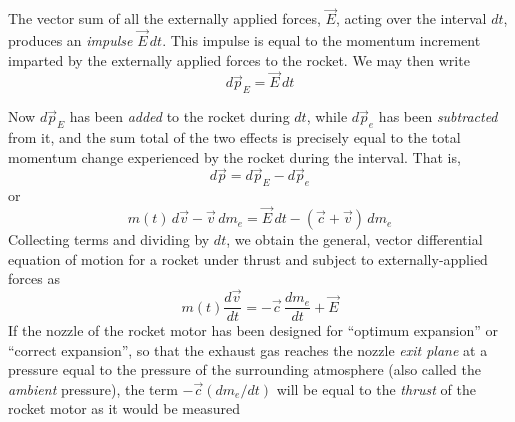 The vector sum of all the externally applied forces, $\vec{E}$, acting over the interval $dt$,
produces an \emph{impulse} $\vec{E}\,dt$. This impulse is equal to the momentum increment imparted
by the externally applied forces to the rocket. We may then write
\begin{equation}\label{ch4:eq:5}
d\vec{p}_E = \vec{E}\,dt
\end{equation}

Now $d\vec{p}_E$ has been \emph{added} to the rocket during $dt$, while $d\vec{p}_e$ has been
\emph{subtracted} from it, and the sum total of the two effects is precisely equal to the total
momentum change experienced by the rocket during the interval. That is,
\begin{equation*}
d\vec{p} = d\vec{p}_E - d\vec{p}_e
\end{equation*}
or
\begin{equation}\label{ch4:eq:6}
m(t)\,d\vec{v} - \vec{v}\,dm_e = \vec{E}\,dt - (\vec{c} + \vec{v})\,dm_e
\end{equation}
Collecting terms and dividing by $dt$, we obtain the general, vector differential equation of
motion for a rocket under thrust and subject to externally-applied forces as
\begin{equation}\label{ch4:eq:7}
m(t)\frac{d\vec{v}}{dt} = -\vec{c}\,\frac{dm_e}{dt} + \vec{E}
\end{equation}
If the nozzle of the rocket motor has been designed for ``optimum expansion'' or ``correct
expansion'', so that the exhaust gas reaches the nozzle \emph{exit plane} at a pressure equal to
the pressure of the surrounding atmosphere (also called the \emph{ambient} pressure), the term
$-\vec{c}(dm_e/dt)$ will be equal to the \emph{thrust} of the rocket motor as it would be measured
